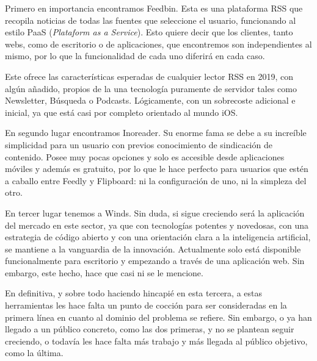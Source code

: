 Primero en importancia encontramos Feedbin. Esta es una plataforma RSS que recopila noticias de todas las fuentes que seleccione el usuario, funcionando al estilo PaaS (\textit{Plataform as a Service}). Esto quiere decir que los clientes, tanto webs, como de escritorio o de aplicaciones, que encontremos son independientes al mismo, por lo que la funcionalidad de cada uno diferirá en cada caso.

Este ofrece las características esperadas de cualquier lector RSS en 2019, con algún añadido, propios de la una tecnología puramente de servidor tales como Newsletter, Búsqueda o Podcasts. Lógicamente, con un sobrecoste adicional e inicial, ya que está casi por completo orientado al mundo iOS.

En segundo lugar encontramos Inoreader. Su enorme fama se debe a su increíble simplicidad para un usuario con previos conocimiento de sindicación de contenido. Posee muy pocas opciones y solo es accesible desde aplicaciones móviles y además es gratuito, por lo que le hace perfecto para usuarios que estén a caballo entre Feedly y Flipboard: ni la configuración de uno, ni la simpleza del otro.

En tercer lugar tenemos a Winds. Sin duda, si sigue creciendo será la aplicación del mercado en este sector, ya que con tecnologías potentes y novedosas, con una estrategia de código abierto y con una orientación clara a la inteligencia artificial, se mantiene a la vanguardia de la innovación. Actualmente solo está disponible funcionalmente para escritorio y empezando a través de una aplicación web. Sin embargo, este hecho, hace que casi ni se le mencione.

En definitiva, y sobre todo haciendo hincapié en esta tercera, a estas herramientas les hace falta un punto de cocción para ser consideradas en la primera línea en cuanto al dominio del problema se refiere. Sin embargo, o ya han llegado a un público concreto, como las dos primeras, y no se plantean seguir creciendo, o todavía les hace falta más trabajo y más llegada al público objetivo, como la última.